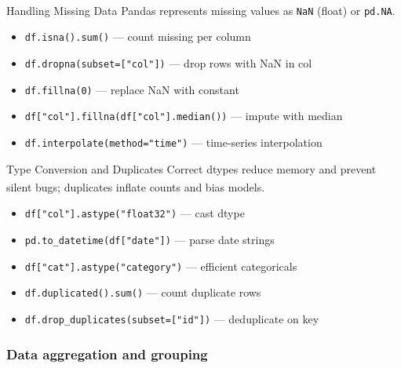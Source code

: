 \begin{v3topic}{Handling Missing Data}
    Pandas represents missing values as \texttt{NaN} (float) or \texttt{pd.NA}\textsuperscript{\cite{molinHandsonDataAnalysis2021}}.
\visualseparator
    \begin{itemize}
        \item \texttt{df.isna().sum()} --- count missing per column
        \item \texttt{df.dropna(subset=["col"])} --- drop rows with NaN in col
        \item \texttt{df.fillna(0)} --- replace NaN with constant
        \item \texttt{df["col"].fillna(df["col"].median())} --- impute with median
        \item \texttt{df.interpolate(method="time")} --- time-series interpolation
    \end{itemize}

\end{v3topic}
\begin{v3topic}{Type Conversion and Duplicates}
    Correct dtypes reduce memory and prevent silent bugs; duplicates inflate counts and bias models\textsuperscript{\cite{molinHandsonDataAnalysis2021}}.
\visualseparator
    \begin{itemize}
        \item \texttt{df["col"].astype("float32")} --- cast dtype
        \item \texttt{pd.to\_datetime(df["date"])} --- parse date strings
        \item \texttt{df["cat"].astype("category")} --- efficient categoricals
        \item \texttt{df.duplicated().sum()} --- count duplicate rows
        \item \texttt{df.drop\_duplicates(subset=["id"])} --- deduplicate on key
    \end{itemize}
\end{v3topic}

\subsubsection{Data aggregation and grouping}

